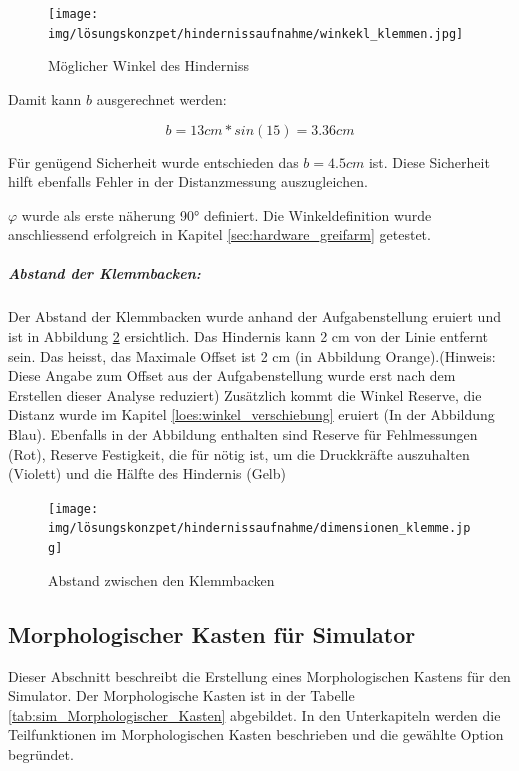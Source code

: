 \documentclass[../main.tex]{subfiles}
\begin{document}
\begin{figure}[H]
        \centering
        \texttt{[image: img/lösungskonzpet/hindernissaufnahme/winkekl\_klemmen.jpg]}
        \caption {Möglicher Winkel des Hinderniss}
        \label{img:loes_winkel_hinderniss}
\end{figure}

Damit kann $b$ ausgerechnet werden:

\[
b = 13cm * sin(15) = 3.36cm
\]

Für genügend Sicherheit wurde entschieden das $b = 4.5cm$ ist. Diese Sicherheit hilft ebenfalls Fehler in der Distanzmessung auszugleichen.

$\varphi$ wurde als erste näherung 90° definiert. Die Winkeldefinition wurde anschliessend erfolgreich in Kapitel \ref{sec:hardware_greifarm} getestet.

\newpage

\subparagraph{Abstand der Klemmbacken:} \label{loes:abstand_klemmen}
Der Abstand der Klemmbacken wurde anhand der Aufgabenstellung eruiert und ist in Abbildung \ref{img:loes_abstand_klemmen} ersichtlich. Das Hindernis kann 2 cm von der Linie entfernt sein. Das heisst, das Maximale Offset ist 2 cm (in Abbildung Orange).(Hinweis: Diese Angabe zum Offset aus der Aufgabenstellung wurde erst nach dem Erstellen dieser Analyse reduziert) Zusätzlich kommt die Winkel Reserve, die Distanz wurde im Kapitel \ref{loes:winkel_verschiebung} eruiert (In der Abbildung Blau). Ebenfalls in der Abbildung enthalten sind Reserve für Fehlmessungen (Rot), Reserve Festigkeit, die für nötig ist, um die Druckkräfte auszuhalten (Violett) und die Hälfte des Hindernis (Gelb)

\begin{figure}[H]
        \centering
        \texttt{[image: img/lösungskonzpet/hindernissaufnahme/dimensionen\_klemme.jpg]}
        \caption {Abstand zwischen den Klemmbacken}
        \label{img:loes_abstand_klemmen}
\end{figure}

\newpage
\subsection{Morphologischer Kasten für Simulator} \label{sec:sim_Morphologischer_Kasten}

Dieser Abschnitt beschreibt die Erstellung eines Morphologischen Kastens für den Simulator. Der Morphologische Kasten ist in der Tabelle \ref{tab:sim_Morphologischer_Kasten} abgebildet. In den Unterkapiteln werden die Teilfunktionen im Morphologischen Kasten beschrieben und die gewählte Option begründet.  
\end{document}
